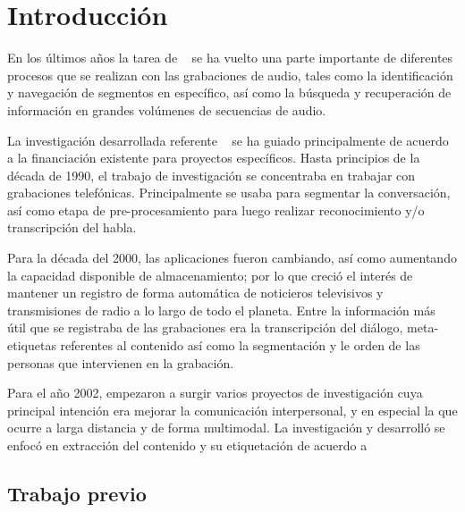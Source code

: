 
\chapter{Introducción}\label{ch:chap1}

En los últimos años la tarea de \SD~ se ha vuelto una parte importante de diferentes procesos que se realizan con las grabaciones de audio, tales como la identificación y navegación de segmentos en específico, así como la búsqueda y recuperación de información en grandes volúmenes de secuencias de audio.

La investigación desarrollada referente \sd~ se ha guiado principalmente de acuerdo a la financiación existente para proyectos específicos. Hasta principios de la década de 1990, el trabajo de investigación se concentraba en trabajar con grabaciones telefónicas. Principalmente se usaba para segmentar la conversación, así como etapa de pre-procesamiento para luego realizar reconocimiento y/o transcripción del habla.

Para la década del 2000, las aplicaciones fueron cambiando, así como aumentando la capacidad disponible de almacenamiento; por lo que creció el interés de mantener un registro de forma automática de noticieros televisivos  y transmisiones de radio a lo largo de todo el planeta. Entre la información más útil que se registraba de las grabaciones era la transcripción del diálogo, meta-etiquetas referentes al contenido así como la segmentación y le orden de las personas que intervienen en la grabación.

Para el año 2002, empezaron a surgir varios proyectos de investigación cuya principal intención era mejorar la comunicación interpersonal, y en especial la que ocurre a larga distancia y de forma multimodal. La investigación y desarrolló se enfocó en extracción del contenido y su etiquetación de acuerdo a 

\section{Trabajo previo}
\label{sec:sota}
